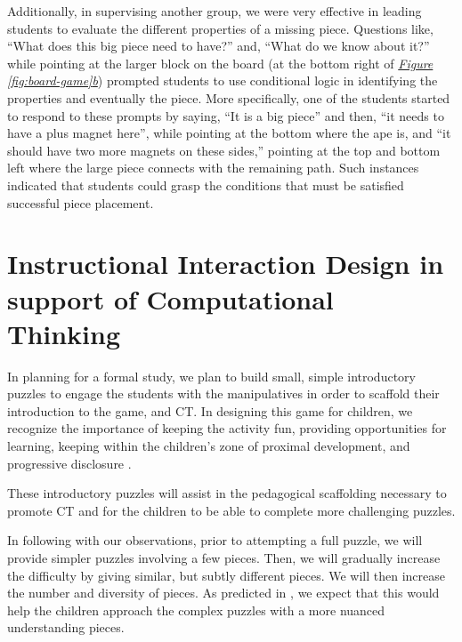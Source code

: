 \documentclass{acm_proc_article-sp}
\begin{document}
Additionally, in supervising another group, we were very effective in leading students to evaluate the different properties of a missing piece. 
Questions like, ``What does this big piece need to have?'' and, ``What do we know about it?'' while pointing at the larger block on the board (at the bottom right of {\em \hyperref[fig:board-game]{Figure \ref{fig:board-game}b}}) prompted students to use conditional logic in identifying the properties and eventually the piece. 
More specifically, one of the students started to respond to these prompts by saying, ``It is a big piece'' and then, ``it needs to have a plus magnet here'', while pointing at the bottom where the ape is, and ``it should have two more magnets on these sides,'' pointing at the top and bottom left where the large piece connects with the remaining path. 
Such instances indicated that students could grasp the conditions that must be satisfied successful piece placement.

\section{\sloppy Instructional Interaction Design in support of Computational Thinking}
\label{sec:instructional_design}
In planning for a formal study, we plan to build small, simple introductory puzzles to engage the students with the manipulatives in order to scaffold their introduction to the game, and CT.
In designing this game for children, we recognize the importance of keeping the activity fun, providing opportunities for learning, keeping within the children's zone of proximal development\cite{vygotsky1987zone}, and progressive disclosure \cite{nielsen2006progressive}.

These introductory puzzles will assist in the pedagogical scaffolding necessary to promote CT and for the children to be able to complete more challenging puzzles.

In following with our observations, prior to attempting a full puzzle, we will provide simpler puzzles involving a few pieces. 
Then, we will gradually increase the difficulty by giving similar, but subtly different pieces.
We will then increase the number and diversity of pieces. 
As predicted in {\em \hyperref[sec:observations]{}}
, we expect that this would help the children approach the complex puzzles with a more nuanced understanding pieces.
\end{document}

